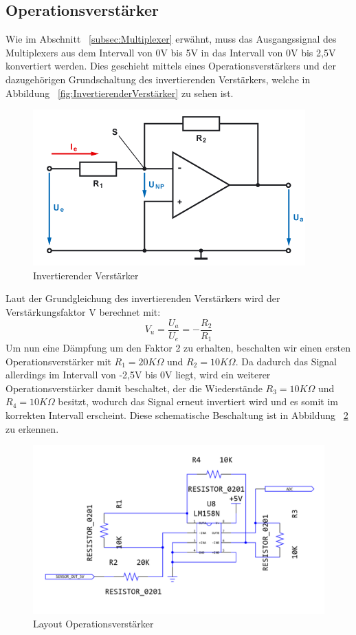 \subsection{Operationsverstärker}\label{subsec:Operationsverstärker}
Wie im Abschnitt ~\ref{subsec:Multiplexer} erwähnt, muss das Ausgangssignal des Multiplexers aus dem Intervall von 0V bis 5V in das Intervall von 0V bis 2,5V konvertiert werden. Dies geschieht mittels eines Operationsverstärkers und der dazugehörigen Grundschaltung des invertierenden Verstärkers, welche in Abbildung ~\ref{fig:InvertierenderVerstärker} zu sehen ist. ~\cite{DataSheet.LM158N}
\begin{figure}[H]
	\includegraphics{images/InvertierenderVerstaerker.png}	
	\caption{Invertierender Verstärker}
	\label{fig:InvertierenderVerstaerker}
\end{figure}
Laut der Grundgleichung des invertierenden Verstärkers wird der Verstärkungsfaktor V berechnet mit:
\[ V_u = \frac{U_a}{U_e} = -\frac{R_2}{R_1} \]
Um nun eine Dämpfung um den Faktor 2 zu erhalten, beschalten wir einen ersten Operationsverstärker mit \(R_1 = 20K\Omega\) und \(R_2 = 10K\Omega\). Da dadurch das Signal allerdings im Intervall von -2,5V bis 0V liegt, wird ein weiterer Operationsverstärker damit beschaltet, der die Wiederstände \(R_3 = 10K\Omega\) und \(R_4 = 10K\Omega\) besitzt, wodurch das Signal erneut invertiert wird und es somit im korrekten Intervall erscheint. 
\newline
Diese schematische Beschaltung ist in Abbildung ~\ref{fig:Layout_OP} zu erkennen.
\begin{figure}[H]
	\includegraphics[width=\textwidth]{images/Layout_OP.png}	
	\caption{Layout Operationsverstärker}
	\label{fig:Layout_OP}
\end{figure}
